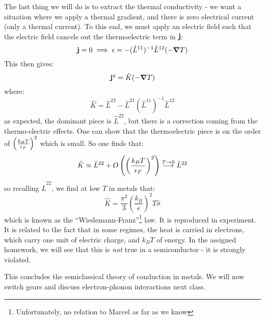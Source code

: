 The last thing we will do is to extract the thermal conductivity - we want a situation where we apply a thermal gradient, and there is zero electrical current (only a thermal current). To this end, we must apply an electric field such that the electric field cancels out the thermoelectric term in $\mathbf{j}$:
\begin{equation}
    \v{j} = 0 \implies \e = -(\hat{L}^{11})^{-1}\hat{L}^{12}(-\nabla T)
\end{equation}
This then gives:
\begin{equation}
    \v{j}^q = \hat{K}(-\nabla T)
\end{equation}
where:
\begin{equation}
    \hat{K} = \hat{L}^{22} - \hat{L}^{21}(\hat{L}^{11})^{-1}\hat{L}^{12}
\end{equation}
as expected, the dominant piece is $\hat{L}^{22}$, but there is a correction coming from the thermo-electric effects. One can show that the thermoelectric piece is on the order of $\left(\frac{k_B T}{\epsilon_F}\right)^2$ which is small. So one finds that:
\begin{equation}
    \hat{K} \approx \hat{L}^{22} + O\left(\left(\frac{k_B T}{\epsilon_F}\right)^2\right) \stackrel{T \to 0}{\longrightarrow} \hat{L}^{22}
\end{equation}
so recalling $\hat{L}^{22}$, we find at low $T$ in metals that:
\begin{equation}
    \hat{K} = \frac{\pi^2}{3}\left(\frac{k_B}{e}\right)^2 T\hat{\sigma}
\end{equation}
which is known as the ``Wiedemann-Franz''\footnote{Unfortunately, no relation to Marcel as far as we know} law. It is reproduced in experiment. It is related to the fact that in some regimes, the heat is carried in electrons, which carry one unit of electric charge, and $k_B T$ of energy. In the assigned homework, we will see that this is \emph{not} true in a semiconductor - it is strongly violated. 

This concludes the semiclassical theory of conduction in metals. We will now switch gears and discuss electron-phonon interactions next class.